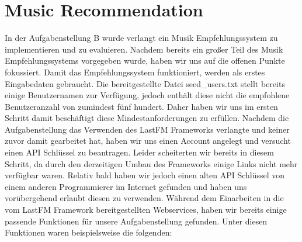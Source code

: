 \documentclass[prodmode,acmtecs]{acmsmall} %
\begin{document}
\section{Music Recommendation}
In der Aufgabenstellung B wurde verlangt ein Musik Empfehlungssystem zu implementieren und zu evaluieren. Nachdem bereits ein großer Teil des Musik Empfehlungssystems vorgegeben wurde, haben wir uns auf die offenen Punkte fokussiert. Damit das Empfehlungssystem funktioniert, werden als erstes Eingabedaten gebraucht. Die bereitgestellte Datei seed\_users.txt stellt bereits einige Benutzernamen zur Verfügung, jedoch enthält diese nicht die empfohlene Benutzeranzahl von zumindest fünf hundert. Daher haben wir uns im ersten Schritt damit beschäftigt diese Mindestanforderungen zu erfüllen. Nachdem die Aufgabenstellung das Verwenden des LastFM Frameworks verlangte und keiner zuvor damit gearbeitet hat, haben wir uns einen Account angelegt und versucht einen API Schlüssel zu beantragen. Leider scheiterten wir bereits in diesem Schritt, da durch den derzeitigen Umbau des Frameworks einige Links nicht mehr verfügbar waren. Relativ bald haben wir jedoch einen alten API Schlüssel von einem anderen Programmierer im Internet gefunden und haben uns vorübergehend erlaubt diesen zu verwenden. Während dem Einarbeiten in die vom LastFM Framework bereitgestellten Webservices, haben wir bereits einige passende Funktionen für unsere Aufgabenstellung gefunden. Unter diesen Funktionen waren beispielsweise die folgenden:
\end{document}

